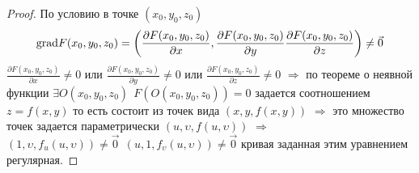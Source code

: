 \begin{proof}
  По условию в точке $(x_0, y_0, z_0)$
  $$
  \mathrm{grad} F(x_0, y_0, z_0) = \left( \frac{\partial F(x_0, y_0, z_0)}{\partial x},
  \frac{\partial F(x_0, y_0, z_0)}{\partial y}
  \frac{\partial F(x_0, y_0, z_0)}{\partial z} \right) \not= \vec 0
  $$
  $\frac{\partial F(x_0, y_0, z_0)}{\partial x} \not= 0$ или
  $\frac{\partial F(x_0, y_0, z_0)}{\partial y} \not= 0$ или
  $\frac{\partial F(x_0, y_0, z_0)}{\partial z} \not= 0$ $\Rightarrow$
  по теореме о неявной функции $\exists O(x_0, y_0, z_0) ~~
  F(O(x_0, y_0, z_0)) = 0$ задается соотношением $z = f(x,y)$
  то есть состоит из точек вида $(x, y, f(x, y))$ $\Rightarrow$ это множество
  точек задается параметрически $(u, \upsilon, f(u, \upsilon))$
  $\Rightarrow$ $(1, \upsilon, f_u(u, \upsilon)) \not= \vec 0 ~~
  (u, 1, f_{\upsilon}(u, \upsilon)) \not= \vec 0$ кривая
  заданная этим уравнением регулярная.
\end{proof}